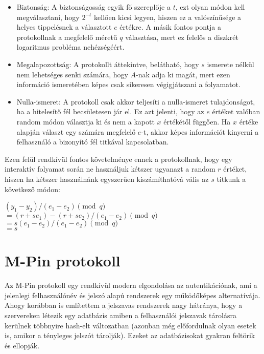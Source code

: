 \begin{itemize}
    \item Biztonság: A biztonságosság egyik fő szereplője a $t$, ezt olyan módon kell megválasztani, hogy $2^{-t}$ kellően kicsi legyen, hiszen ez a valószínűsége a helyes tippelésnek a választott $e$ értékre. A másik fontos pontja a protokollnak a megfelelő méretű $q$ választása, mert ez felelős a diszkrét logaritmus probléma nehézségéért.
    \item Megalapozottság: A protokollt áttekintve, belátható, hogy $s$ ismerete nélkül nem lehetséges senki számára, hogy $A$-nak adja ki magát, mert ezen információ ismeretében képes csak sikeresen végigjátszani a folyamatot.
    \item Nulla-ismeret: A protokoll csak akkor teljesíti a nulla-ismeret tulajdonságot, ha a hitelesítő fél becsületesen jár el. Ez azt jelenti, hogy az $e$ értéket valóban random módon választja ki és nem a kapott $x$ értékétől függően. Ha $x$ értéke alapján választ egy számára megfelelő $e$-t, akkor képes információt kinyerni a felhasználó a bizonyító fél titkával kapcsolatban.
\end{itemize}

\begin{minipage}{\textwidth}
Ezen felül rendkívül fontos követelménye ennek a protokollnak, hogy egy interaktív folyamat során ne használjuk kétszer ugyanazt a random $r$ értéket, hiszen ha kétszer használnánk egyszerűen kiszámíthatóvá vális az $s$ titkunk a következő módon:

$(y_1 - y_2) / (e_1 - e_2) \pmod{q}$ \\
$= (r + se_1) - (r + se_2) / (e_1 - e_2) \pmod{q}$ \\
$= s(e_1 - e_2) / (e_1 - e_2) \pmod{q}$ \\
$= s$
\end{minipage}

\section*{M-Pin protokoll}

Az M-Pin protokoll \cite{MPin} egy rendkívül modern elgondolása az autentikációnak, ami a jelenlegi felhasználónév és jelszó alapú rendszerek egy működőképes alternatívája. Ahogy korábban is említettem a jelszavas rendszerek nagy hátránya, hogy a szervereken létezik egy adatbázis amiben a felhasználói jelszavak tárolásra kerülnek többnyire hash-elt változatban (azonban még előfordulnak olyan esetek is, amikor a tényleges jelszót tárolják). Ezeket az adatbázisokat gyakran feltörik és ellopják.

